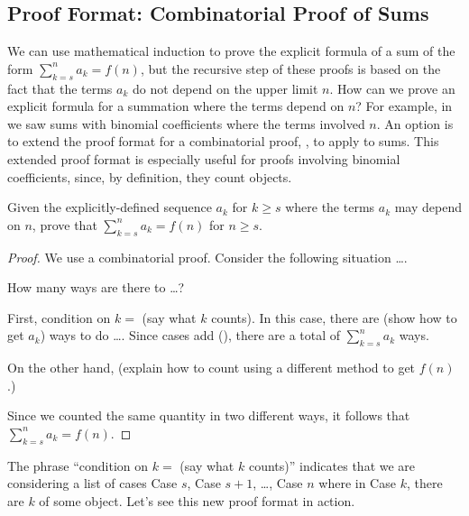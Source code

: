 \newcommand{\subpffcombsums}{Proof Format: Combinatorial Proof of Sums}
\subsection{\subpffcombsums}
\label{sub_pff_comb_sums}

We can use mathematical induction to prove the explicit formula of a sum of the form $\displaystyle \sum_{k=s}^na_k=f(n)$, but the recursive step of these proofs is based on the fact that the terms $a_k$ do not depend on the upper limit $n$. How can we prove an explicit formula for a summation where the terms depend on $n$? For example, in  we saw sums with binomial coefficients where the terms involved $n$. An option is to extend the proof format for a combinatorial proof, , to apply to sums.  This extended proof format is especially useful for proofs involving binomial coefficients, since, by definition, they count objects.

\begin{pff}
\label{pff_comb_proof_sum}  
    Given the explicitly-defined sequence $a_k$ for $k \ge s$ where the terms $a_k$ may depend on $n$, prove that $\displaystyle \sum_{k=s}^na_k=f(n)$ for $n \ge s$.
        \begin{proof}
            We use a combinatorial proof. Consider the following situation \ldots.

            How many ways are there to \ldots?

            First, condition on $k=$ (say what $k$ counts).  In this case, there are (show how to get $a_k$) ways to do \ldots.  Since cases add (), there are a total of $\displaystyle \sum_{k=s}^na_k$ ways.

            On the other hand, (explain how to count using a different method to get $f(n)$.)

            Since we counted the same quantity in two different ways, it follows that $\displaystyle \sum_{k=s}^na_k=f(n)$.
        \end{proof}
\end{pff}

The phrase ``condition on $k=$ (say what $k$ counts)'' indicates that we are considering a list of cases Case $s$, Case $s+1$, \ldots, Case $n$ where in Case $k$, there are $k$ of some object. Let's see this new proof format in action.

